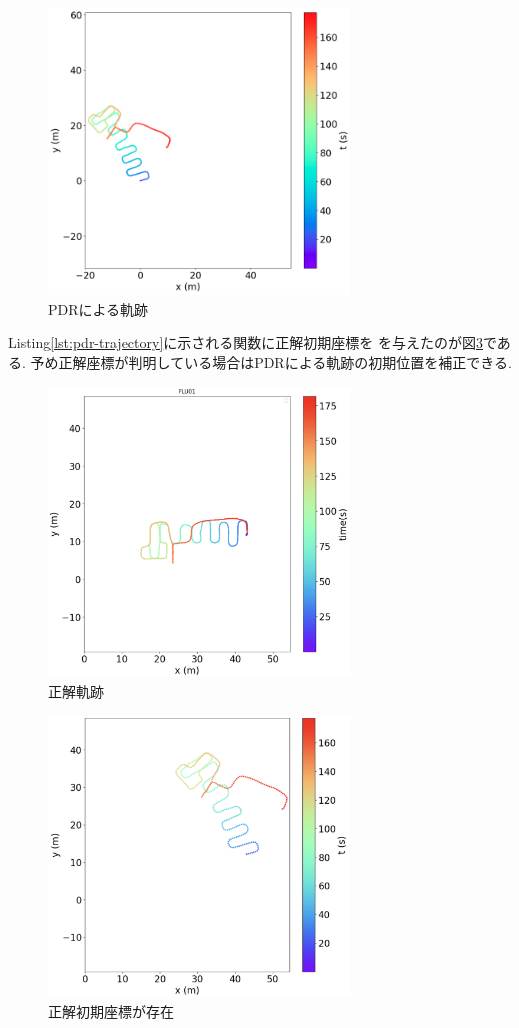 \begin{figure}[ht]
	\centering
	\includegraphics[width=80mm]{image/pdr.jpg}
	\caption{PDRによる軌跡}    \label{fig:pdr}
\end{figure}

Listing\ref{lst:pdr-trajectory}に示される関数に正解初期座標を
を与えたのが図\ref{fig:pdr-move}である.
予め正解座標が判明している場合はPDRによる軌跡の初期位置を補正できる.

\begin{figure}[ht]
	\centering
	\includegraphics[width=80mm]{image/gt2.jpg}
	\caption{正解軌跡}    \label{fig:gt-trajectory}
\end{figure}

\begin{figure}[ht]
	\centering
	\includegraphics[width=80mm]{image/pdr-move.jpg}
	\caption{正解初期座標が存在}    \label{fig:pdr-move}
\end{figure}
